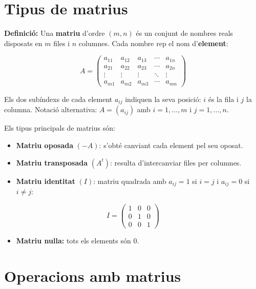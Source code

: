 \section{Tipus de matrius}

\textbf{Definició:} Una \textbf{matriu} d'ordre $(m, n)$ és un conjunt de nombres reals disposats en $m$ files i $n$ columnes. Cada nombre rep el nom d'\textbf{element}:

\begin{equation}
A = \begin{pmatrix} a_{11} & a_{12} & a_{13} & \cdots & a_{1n} \\ a_{21} & a_{22} & a_{23} & \cdots & a_{2n} \\ \vdots & \vdots & \vdots & \ddots & \vdots \\ a_{m1} & a_{m2} & a_{m3} & \cdots & a_{mn} \end{pmatrix}
\end{equation}

Els dos subíndexs de cada element $a_{ij}$ indiquen la seva posició: $i$ és la fila i $j$ la columna. Notació alternativa: $A = (a_{ij})$ amb $i = 1, \ldots, m$ i $j = 1, \ldots, n$.

Els tipus principals de matrius són:

\begin{itemize}
\item \textbf{Matriu oposada} $(-A)$: s'obté canviant cada element pel seu oposat.
\item \textbf{Matriu transposada} $(A^t)$: resulta d'intercanviar files per columnes.
\item \textbf{Matriu identitat} $(I)$: matriu quadrada amb $a_{ij} = 1$ si $i = j$ i $a_{ij} = 0$ si $i \neq j$:
\end{itemize}

\begin{equation*}
I = \begin{pmatrix} 1 & 0 & 0 \\ 0 & 1 & 0 \\ 0 & 0 & 1 \end{pmatrix}
\end{equation*}

\begin{itemize}
\item \textbf{Matriu nul\textperiodcentered{}la:} tots els elements són $0$.
\end{itemize}

\section{Operacions amb matrius}

